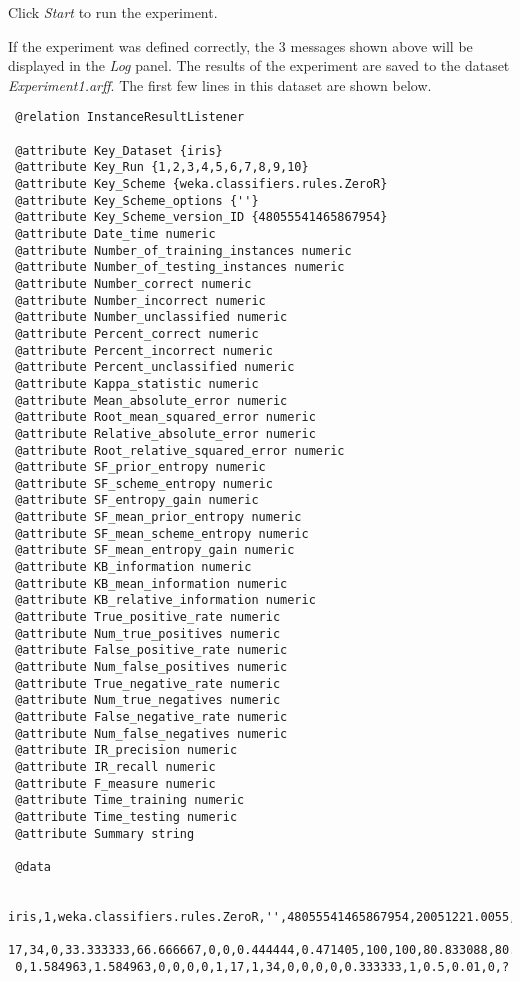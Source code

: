 \documentclass[a4paper]{article}
\begin{document}
Click \textit{Start} to run the experiment.
\begin{center}
\end{center}

If the experiment was defined correctly, the 3 messages shown above will be displayed in the \textit{Log} panel. The results of the experiment are saved to the dataset \textit{Experiment1.arff}. The first few lines in this dataset are shown below.

\begin{verbatim}
 @relation InstanceResultListener

 @attribute Key_Dataset {iris}
 @attribute Key_Run {1,2,3,4,5,6,7,8,9,10}
 @attribute Key_Scheme {weka.classifiers.rules.ZeroR}
 @attribute Key_Scheme_options {''}
 @attribute Key_Scheme_version_ID {48055541465867954}
 @attribute Date_time numeric
 @attribute Number_of_training_instances numeric
 @attribute Number_of_testing_instances numeric
 @attribute Number_correct numeric
 @attribute Number_incorrect numeric
 @attribute Number_unclassified numeric
 @attribute Percent_correct numeric
 @attribute Percent_incorrect numeric
 @attribute Percent_unclassified numeric
 @attribute Kappa_statistic numeric
 @attribute Mean_absolute_error numeric
 @attribute Root_mean_squared_error numeric
 @attribute Relative_absolute_error numeric
 @attribute Root_relative_squared_error numeric
 @attribute SF_prior_entropy numeric
 @attribute SF_scheme_entropy numeric
 @attribute SF_entropy_gain numeric
 @attribute SF_mean_prior_entropy numeric
 @attribute SF_mean_scheme_entropy numeric
 @attribute SF_mean_entropy_gain numeric
 @attribute KB_information numeric
 @attribute KB_mean_information numeric
 @attribute KB_relative_information numeric
 @attribute True_positive_rate numeric
 @attribute Num_true_positives numeric
 @attribute False_positive_rate numeric
 @attribute Num_false_positives numeric
 @attribute True_negative_rate numeric
 @attribute Num_true_negatives numeric
 @attribute False_negative_rate numeric
 @attribute Num_false_negatives numeric
 @attribute IR_precision numeric
 @attribute IR_recall numeric
 @attribute F_measure numeric
 @attribute Time_training numeric
 @attribute Time_testing numeric
 @attribute Summary string

 @data

 iris,1,weka.classifiers.rules.ZeroR,'',48055541465867954,20051221.0055,99,51,
 17,34,0,33.333333,66.666667,0,0,0.444444,0.471405,100,100,80.833088,80.833088,
 0,1.584963,1.584963,0,0,0,0,1,17,1,34,0,0,0,0,0.333333,1,0.5,0.01,0,?
\end{verbatim}
\end{document}
